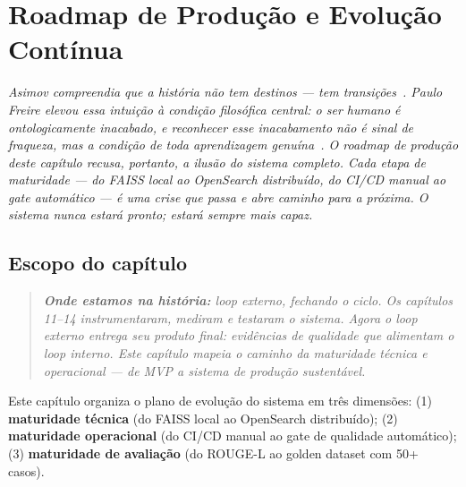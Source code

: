 \chapter{Roadmap de Produ\c{c}\~ao e Evolu\c{c}\~ao Cont\'inua}
\label{chap:roadmap_producao}

{\small\itshape\color{AccentGray}
Asimov compreendia que a hist\'{o}ria n\~{a}o tem destinos --- tem transi\c{c}\~{o}es~\cite{asimov1972godsthemselves}. Paulo Freire elevou essa intui\c{c}\~{a}o \`{a} condi\c{c}\~{a}o filos\'{o}fica central: o ser humano \'{e} ontologicamente inacabado, e reconhecer esse inacabamento n\~{a}o \'{e} sinal de fraqueza, mas a condi\c{c}\~{a}o de toda aprendizagem genuína~\cite{freire1996autonomia}. O \textit{roadmap} de produ\c{c}\~{a}o deste cap\'{i}tulo recusa, portanto, a ilus\~{a}o do sistema completo. Cada etapa de maturidade --- do FAISS local ao OpenSearch distribu\'{i}do, do CI/CD manual ao \textit{gate} autom\'{a}tico --- \'{e} uma crise que passa e abre caminho para a pr\'{o}xima. O sistema nunca estar\'{a} pronto; estar\'{a} sempre mais capaz.\par}
\vspace{0.6em}
\section{Escopo do cap\'itulo}

\begin{quote}\itshape
\textbf{Onde estamos na hist\'oria:} loop externo, fechando o ciclo.
Os cap\'itulos 11--14 instrumentaram, mediram e testaram o sistema.
Agora o loop externo entrega seu produto final: evid\^encias de qualidade
que alimentam o loop interno. Este cap\'itulo mapeia o caminho da maturidade
t\'ecnica e operacional --- de MVP a sistema de produ\c{c}\~ao sustent\'avel.
\end{quote}

Este cap\'itulo organiza o plano de evolu\c{c}\~ao do sistema em tr\^es
dimens\~oes: (1) \textbf{maturidade t\'ecnica} (do FAISS local ao OpenSearch
distribu\'ido); (2) \textbf{maturidade operacional} (do CI/CD manual ao
gate de qualidade autom\'atico); (3) \textbf{maturidade de avalia\c{c}\~ao}
(do ROUGE-L ao golden dataset com 50+ casos).

